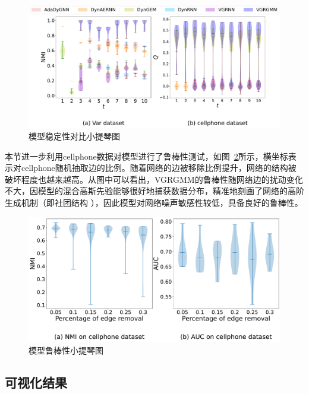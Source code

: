 \begin{figure}[htbp]
	\centering
	\includegraphics[width=.66\textwidth]{figures/chap06/chap5STNQ.pdf}
	\caption{模型稳定性对比小提琴图}
	\label{fig:STNQ}
\end{figure}

本节进一步利用cellphone数据对模型进行了鲁棒性测试，如图~\ref{fig:robustWP}所示，横坐标表示对cellphone随机抽取边的比例。随着网络的边被移除比例提升，网络的结构被破坏程度也越来越高。从图中可以看出，VGRGMM的鲁棒性随网络边的扰动变化不大，因模型的混合高斯先验能够很好地捕获数据分布，精准地刻画了网络的高阶生成机制（即社团结构 ），因此模型对网络噪声敏感性较低，具备良好的鲁棒性。
\begin{figure}[htbp]
	\centering
	\includegraphics[width=.6\textwidth]{figures/chap06/workplaceRBNA.pdf}
	\caption{模型鲁棒性小提琴图}
	\label{fig:robustWP}
\end{figure}

\subsection{可视化结果}


